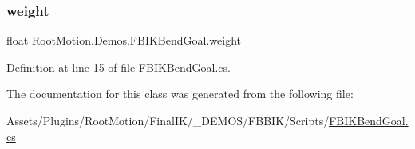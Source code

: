 \subsubsection{\texorpdfstring{weight}{weight}}
{\footnotesize\ttfamily float Root\+Motion.\+Demos.\+F\+B\+I\+K\+Bend\+Goal.\+weight}



Definition at line 15 of file F\+B\+I\+K\+Bend\+Goal.\+cs.



The documentation for this class was generated from the following file\+:\begin{DoxyCompactItemize}
\item 
Assets/\+Plugins/\+Root\+Motion/\+Final\+I\+K/\+\_\+\+D\+E\+M\+O\+S/\+F\+B\+B\+I\+K/\+Scripts/\mbox{\hyperlink{_f_b_i_k_bend_goal_8cs}{F\+B\+I\+K\+Bend\+Goal.\+cs}}\end{DoxyCompactItemize}
